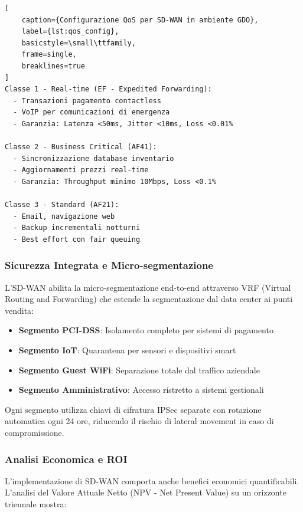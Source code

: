 \begin{lstlisting}[
    caption={Configurazione QoS per SD-WAN in ambiente GDO},
    label={lst:qos_config},
    basicstyle=\small\ttfamily,
    frame=single,
    breaklines=true
]
Classe 1 - Real-time (EF - Expedited Forwarding):
  - Transazioni pagamento contactless
  - VoIP per comunicazioni di emergenza
  - Garanzia: Latenza <50ms, Jitter <10ms, Loss <0.01%

Classe 2 - Business Critical (AF41):
  - Sincronizzazione database inventario
  - Aggiornamenti prezzi real-time
  - Garanzia: Throughput minimo 10Mbps, Loss <0.1%

Classe 3 - Standard (AF21):
  - Email, navigazione web
  - Backup incrementali notturni
  - Best effort con fair queuing
\end{lstlisting}

\subsubsection{\texorpdfstring{\textbf{Sicurezza Integrata e Micro-segmentazione}}{3.3.1.4 - Sicurezza Integrata e Micro-segmentazione}}

L'SD-WAN abilita la micro-segmentazione end-to-end attraverso VRF (Virtual Routing and Forwarding) che estende la segmentazione dal data center ai punti vendita:

\begin{itemize}
    \item \textbf{Segmento PCI-DSS}: Isolamento completo per sistemi di pagamento
    \item \textbf{Segmento IoT}: Quarantena per sensori e dispositivi smart
    \item \textbf{Segmento Guest WiFi}: Separazione totale dal traffico aziendale
    \item \textbf{Segmento Amministrativo}: Accesso ristretto a sistemi gestionali
\end{itemize}

Ogni segmento utilizza chiavi di cifratura IPSec separate con rotazione automatica ogni 24 ore, riducendo il rischio di lateral movement in caso di compromissione.

\subsubsection{\texorpdfstring{\textbf{Analisi Economica e ROI}}{3.3.1.5 - Analisi Economica e ROI}}

L'implementazione di SD-WAN comporta anche benefici economici quantificabili. L'analisi del Valore Attuale Netto (NPV - Net Present Value) su un orizzonte triennale mostra:

